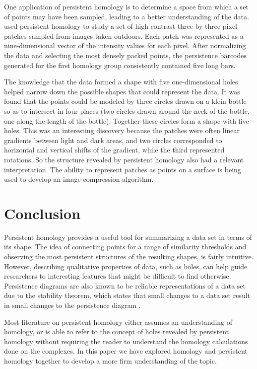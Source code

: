 One application of persistent homology is to determine a space from which a set of points may have been sampled, leading to a better understanding of the data.
\citet{carlssonb} used persistent homology to study a set of high contrast three by three pixel patches sampled from images taken outdoors.
Each patch was represented as a nine-dimensional vector of the intensity values for each pixel.
After normalizing the data and selecting the most densely packed points, the persistence barcodes generated for the first homology group consistently contained five long bars.

The knowledge that the data formed a shape with five one-dimensional holes helped narrow down the possible shapes that could represent the data.
It was found that the points could be modeled by three circles drawn on a klein bottle so as to intersect in four places (two circles drawn around the neck of the bottle, one along the length of the bottle).
Together these circles form a shape with five holes.
This was an interesting discovery because the patches were often linear gradients between light and dark areas, and two circles corresponded to horizontal and vertical shifts of the gradient, while the third represented rotations.
So the structure revealed by persistent homology also had a relevant interpretation.
The ability to represent patches as points on a surface is being used to develop an image compression algorithm.

\section{Conclusion}\label{sec:conclusion}

Persistent homology provides a useful tool for summarizing a data set in terms of its shape.
The idea of connecting points for a range of similarity thresholds and observing the most persistent structures of the resulting shapes, is fairly intuitive.
However, describing qualitative properties of data, such as holes, can help guide researchers to interesting features that might be difficult to find otherwise.
Persistence diagrams are also known to be reliable representations of a data set due to the stability theorem, which states that small changes to a data set result in small changes to the persistence diagram \cite{cohen-steiner, wagner}.

Most literature on persistent homology either assumes an understanding of homology, or is able to refer to the concept of holes revealed by persistent homology without requiring the reader to understand the homology calculations done on the complexes.
In this paper we have explored homology and persistent homology together to develop a more firm understanding of the topic.





